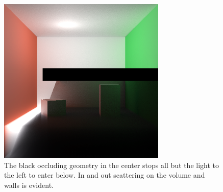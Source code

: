 \documentclass[12pt]{ucthesis}
\begin{document}
\begin{figure}[h!]
    \centering
    \includegraphics[width=80mm]{img/one_side_corrected.png}
    \caption{The black occluding geometry in the center stops all but the light to the left to enter below.  In and out scattering on the volume and walls is evident.}
\end{figure}
\end{document}
